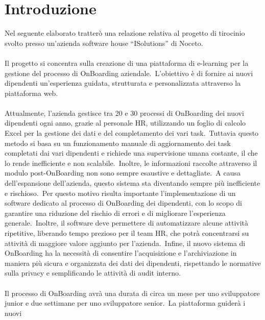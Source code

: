 \chapter*{Introduzione} %
Nel seguente elaborato tratterò una relazione relativa al progetto di tirocinio svolto 
presso un'azienda software house “ISolutions” di Noceto.
\\ \\
Il progetto si concentra sulla creazione di una piattaforma di e-learning per la 
gestione del processo di OnBoarding aziendale.\ L'obiettivo è di fornire ai nuovi 
dipendenti un'esperienza guidata, strutturata e personalizzata attraverso la 
piattaforma web. 
\\ \\
Attualmente, l'azienda gestisce tra 20 e 30 processi di OnBoarding dei nuovi 
dipendenti ogni anno, grazie al personale HR, utilizzando un foglio di calcolo Excel 
per la gestione dei dati e del completamento dei vari task.\ Tuttavia questo metodo si 
basa su un funzionamento manuale di aggiornamento dei task completati dai vari 
dipendenti e richiede una supervisione umana costante, il che lo rende inefficiente e 
non scalabile.\ Inoltre, le informazioni raccolte attraverso il modulo post-OnBoarding 
non sono sempre esaustive e dettagliate.\ A causa dell'espansione dell'azienda, 
questo sistema sta diventando sempre più inefficiente e rischioso.\ Per questo motivo 
risulta importante l'implementazione di un software dedicato al processo di 
OnBoarding dei dipendenti, con lo scopo di garantire una riduzione del rischio di 
errori e di migliorare l'esperienza generale.\ Inoltre, il software deve permettere di 
automatizzare alcune attività ripetitive, liberando tempo prezioso per il team HR, che 
potrà concentrarsi su attività di maggiore valore aggiunto per l'azienda.\ Infine, il 
nuovo sistema di OnBoarding ha la necessità di consentire l'acquisizione e 
l'archiviazione in maniera più sicura e organizzata dei dati dei dipendenti, 
rispettando le normative sulla privacy e semplificando le attività di audit interno.
\\ \\
Il processo di OnBoarding avrà una durata di circa un mese per uno sviluppatore 
junior e due settimane per uno sviluppatore senior.\ La piattaforma guiderà i nuovi 
